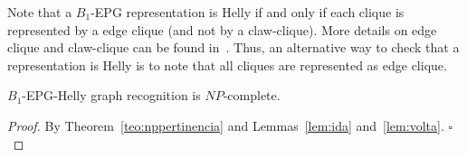 \documentclass[runningheads]{llncs}
\begin{document}










Note that a $B_1$-EPG representation is Helly if and only if each clique is represented by a edge clique (and not by a claw-clique). More details on edge clique and claw-clique can be found in~\cite{golumbic2009}. Thus, an alternative way to check that a representation is Helly is to note that all cliques are represented as edge clique. 

\begin{theorem}
{\sc $B_{1}$-EPG-Helly graph recognition} is $NP$-complete.
\end{theorem}
\begin{proof} %
By Theorem~\ref{teo:nppertinencia} and Lemmas~\ref{lem:ida} and~\ref{lem:volta}.
$\square$ \end{proof}
\end{document}
